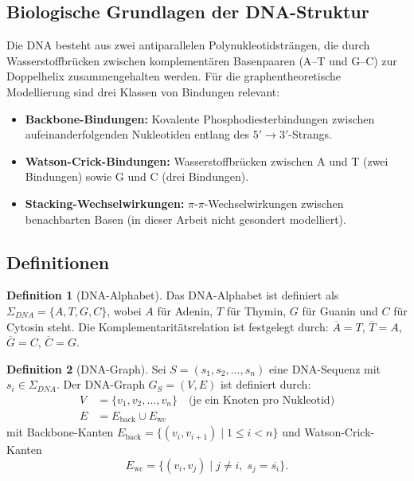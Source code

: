 ﻿\documentclass[a4paper,12pt]{article}
\theoremstyle{definition}
\newtheorem{definition}{Definition}
\begin{document}
\subsection{Biologische Grundlagen der DNA-Struktur}

Die DNA besteht aus zwei antiparallelen Polynukleotidsträngen, die durch
Wasserstoffbrücken zwischen komplementären Basenpaaren (A--T und G--C) zur
Doppelhelix zusammengehalten werden. Für die graphentheoretische Modellierung
sind drei Klassen von Bindungen relevant:

\begin{itemize}
    \item \textbf{Backbone-Bindungen:} Kovalente Phosphodiesterbindungen zwischen
          aufeinanderfolgenden Nukleotiden entlang des $5' \to 3'$-Strangs.
    \item \textbf{Watson-Crick-Bindungen:} Wasserstoffbrücken zwischen A und T
          (zwei Bindungen) sowie G und C (drei Bindungen).
    \item \textbf{Stacking-Wechselwirkungen:} $\pi$-$\pi$-Wechselwirkungen zwischen
          benachbarten Basen (in dieser Arbeit nicht gesondert modelliert).
\end{itemize}

\subsection{Definitionen}

\begin{definition}[DNA-Alphabet]
    Das DNA-Alphabet ist definiert als $\Sigma_{DNA} = \{A, T, G, C\}$, wobei
    $A$ f\"{u}r Adenin, $T$ f\"{u}r Thymin, $G$ f\"{u}r Guanin und $C$ f\"{u}r
    Cytosin steht. Die Komplementarit\"{a}tsrelation ist festgelegt durch:
    $\overline{A} = T$, $\overline{T} = A$, $\overline{G} = C$, $\overline{C} = G$.
\end{definition}

\begin{definition}[DNA-Graph]
    Sei $S = (s_1, s_2, \ldots, s_n)$ eine DNA-Sequenz mit $s_i \in \Sigma_{DNA}$.
    Der DNA-Graph $G_S = (V, E)$ ist definiert durch:
    \begin{align*}
        V &= \{v_1, v_2, \ldots, v_n\} \quad \text{(je ein Knoten pro Nukleotid)} \\
        E &= E_{\text{back}} \cup E_{\text{wc}}
    \end{align*}
    mit Backbone-Kanten $E_{\text{back}} = \{(v_i, v_{i+1}) \mid 1 \leq i < n\}$
    und Watson-Crick-Kanten
    \[
        E_{\text{wc}} = \{(v_i, v_j) \mid j \neq i,\; s_j = \overline{s_i}\}.
    \]
\end{definition}
\end{document}
